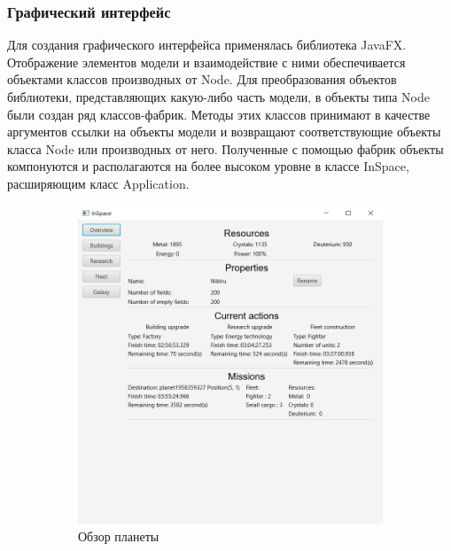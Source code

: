 \subsubsection{Графический интерфейс}
Для создания графического интерфейса применялась библиотека JavaFX. Отображение элементов модели и взаимодействие с ними обеспечивается объектами классов производных от Node. Для преобразования объектов библиотеки, представляющих какую-либо часть модели, в объекты типа Node были создан ряд классов-фабрик. Методы этих классов принимают в качестве аргументов ссылки на объекты модели и возвращают соответствующие объекты класса Node или производных от него. Полученные с помощью фабрик объекты компонуются и располагаются на более высоком уровне в классе InSpace, расширяющим класс Application.

\begin{figure}[H]
\centering
\begin{subfigure}[b]{0.4\textwidth} 
\includegraphics[width=1\textwidth]{../screenshots/1.png}
\caption{Обзор планеты}
\end{subfigure}
\begin{subfigure}[b]{0.4\textwidth} 

\end{subfigure}
\end{figure}
